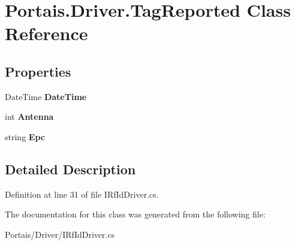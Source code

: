\hypertarget{class_portais_1_1_driver_1_1_tag_reported}{}\section{Portais.\+Driver.\+Tag\+Reported Class Reference}
\label{class_portais_1_1_driver_1_1_tag_reported}
\subsection*{Properties}
\begin{DoxyCompactItemize}
\item 
Date\+Time {\bfseries Date\+Time}\hypertarget{class_portais_1_1_driver_1_1_tag_reported_a8615be3491f3d4f00dbde3ec4833a86a}{}\label{class_portais_1_1_driver_1_1_tag_reported_a8615be3491f3d4f00dbde3ec4833a86a}

\item 
int {\bfseries Antenna}\hypertarget{class_portais_1_1_driver_1_1_tag_reported_af31833f849b29ec7feb00600e321d938}{}\label{class_portais_1_1_driver_1_1_tag_reported_af31833f849b29ec7feb00600e321d938}

\item 
string {\bfseries Epc}\hypertarget{class_portais_1_1_driver_1_1_tag_reported_aced0aa4f22b0cb4664363b6e25fb5b51}{}\label{class_portais_1_1_driver_1_1_tag_reported_aced0aa4f22b0cb4664363b6e25fb5b51}

\end{DoxyCompactItemize}


\subsection{Detailed Description}


Definition at line 31 of file I\+Rf\+Id\+Driver.\+cs.



The documentation for this class was generated from the following file\+:\begin{DoxyCompactItemize}
\item 
Portais/\+Driver/I\+Rf\+Id\+Driver.\+cs\end{DoxyCompactItemize}
